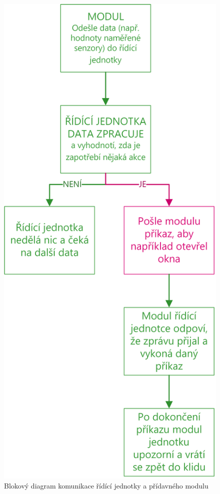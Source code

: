 \begin{figure}[h]
    \centering
    \includegraphics[scale=0.9]{img/SOFTWARE/KOMUNIKACE_MODULU.png}
    \caption{Blokový diagram komunikace řídící jednotky a přídavného modulu}
    \label{fig:PPCU-to-MODULE-communication}
\end{figure}

\newpage